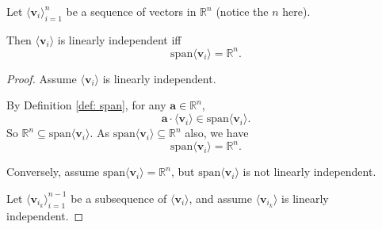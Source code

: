\begin{lemma}
	Let $\langle \mathbf v_i \rangle_{i = 1}^n$ be a sequence of vectors in $\mathbb R^n$ (notice the $n$ here).
	
	Then $\langle \mathbf v_i \rangle$ is linearly independent iff
	$$
	\mathrm{span} \langle \mathbf v_i \rangle = \mathbb R^n.
	$$
	
	\begin{proof}
		Assume $\langle \mathbf v_i \rangle$ is linearly independent.
		
		By Definition \ref{def: span}, for any $\mathbf a \in \mathbb R^n$,
		$$
		\mathbf a \cdot \langle \mathbf v_i \rangle \in \mathrm{span}\langle \mathbf v_i \rangle.
		$$
		So $\mathbb R^n \subseteq \mathrm{span} \langle \mathbf v_i \rangle$. As $\mathrm{span} \langle \mathbf v_i \rangle \subseteq \mathbb R^n$ also, we have
		$$
		\mathrm{span} \langle \mathbf v_i \rangle = \mathbb R^n.
		$$
		
		\qedlm
		
		Conversely, assume $\mathrm{span} \langle \mathbf v_i \rangle = \mathbb R^n$, but $\mathrm{span}\langle \mathbf v_i \rangle$ is not linearly independent.
		
		Let $\langle \mathbf v_{i_k} \rangle_{i = 1}^{n - 1}$ be a subsequence of $\langle \mathbf v_i \rangle$, and assume $\langle \mathbf v_{i_k} \rangle$ is linearly independent. 
	\end{proof}
\end{lemma}
















































%